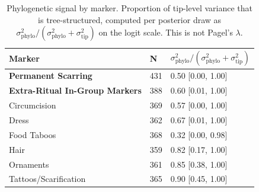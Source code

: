 \begin{table}[!ht]
\centering
\small
\caption{Phylogenetic signal by marker. Proportion of tip-level variance that is tree-structured, computed per posterior draw as $\sigma^2_{\mathrm{phylo}} / (\sigma^2_{\mathrm{phylo}} + \sigma^2_{\mathrm{tip}})$ on the logit scale. This is not Pagel's $\lambda$.}
\label{tab:ext_phylo_signal}
\begin{tabular}{lll}
\toprule
Marker & N & $\sigma^2_{\mathrm{phylo}} / (\sigma^2_{\mathrm{phylo}} + \sigma^2_{\mathrm{tip}})$ \\
\midrule
\textbf{Permanent Scarring} & 431 & 0.50 [0.00, 1.00] \\
\textbf{Extra-Ritual In-Group Markers} & 388 & 0.60 [0.01, 1.00] \\
\midrule
Circumcision & 369 & 0.57 [0.00, 1.00] \\
Dress & 362 & 0.67 [0.01, 1.00] \\
Food Taboos & 368 & 0.32 [0.00, 0.98] \\
Hair & 359 & 0.82 [0.17, 1.00] \\
Ornaments & 361 & 0.85 [0.38, 1.00] \\
Tattoos/Scarification & 365 & 0.90 [0.45, 1.00] \\
\bottomrule
\end{tabular}
\end{table}